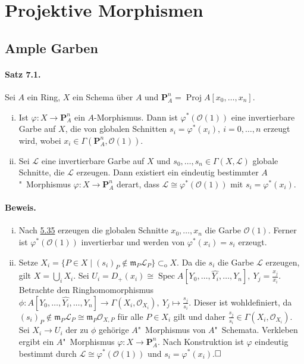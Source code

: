 \documentclass[11pt,b5paper,openany]{memoir}
\def \qed {$\hfill\square$}
\begin{document}
\section{Projektive Morphismen}

\subsection{Ample Garben}

\paragraph{Satz 7.1.}\label{7.1} Sei $A$ ein Ring, $X$ ein Schema über $A$ und $\mathbf{P}_A^n=\operatorname{Proj}A[x_0,\ldots,x_n]$.
\begin{enumerate}[(i)]
\item Ist $\varphi:X\to\mathbf{P}_A^n$ ein $A$-Morphismus. Dann ist $\varphi^\ast(\mathcal{O}(1))$ eine invertierbare Garbe auf $X$, die von globalen Schnitten $s_i=\varphi^\ast(x_i),\ i=0,\ldots,n$ erzeugt wird, wobei $x_i\in\Gamma(\mathbf{P}_A^n,\mathcal{O}(1))$.
\item Sei $\mathcal{L}$ eine invertierbare Garbe auf $X$ und $s_0,\ldots,s_n\in\Gamma(X,\mathcal{L})$ globale Schnitte, die $\mathcal{L}$ erzeugen. Dann existiert ein eindeutig bestimmter $A$"~Morphismus $\varphi:X\to\mathbf{P}_A^n$ derart, dass $\mathcal{L}\cong\varphi^\ast(\mathcal{O}(1))$ mit $s_i=\varphi^\ast(x_i)$.
\end{enumerate}

\paragraph{Beweis.} \begin{enumerate}[(i)]
\item Nach \hyperref[5.35]{5.35} erzeugen die globalen Schnitte $x_0,\ldots,x_n$ die Garbe $\mathcal{O}(1)$. Ferner ist $\varphi^\ast(\mathcal{O}(1))$ invertierbar und werden von $\varphi^\ast(x_i)=s_i$ erzeugt.
\item Setze $X_i=\{P\in X\mid (s_i)_P\not\in\mathfrak{m}_P\mathcal{L}_P\}\subset_\text{o}X$. Da die $s_i$ die Garbe $\mathcal{L}$ erzeugen, gilt $X=\bigcup_iX_i$. Sei $U_i=D_+(x_i)\cong\operatorname{Spec}A[Y_0,\ldots,\widehat{Y_i},\ldots,Y_n],\ Y_j=\frac{x_j}{x_i}$. Betrachte den Ringhomomorphismus $\phi:A[Y_0,\ldots,\widehat{Y_i},\ldots,Y_n]\to\Gamma(X_i,\mathcal{O}_{X_i}),\ Y_j\mapsto \frac{s_j}{s_i}$. Dieser ist wohldefiniert, da  $(s_i)_P\not\in \mathfrak{m}_P\mathcal{L}_P\cong\mathfrak{m}_P\mathcal{O}_{X,P}$ für alle $P\in X_i$ gilt und daher $\frac{s_j}{s_i}\in\Gamma(X_i,\mathcal{O}_{X_i})$. Sei $X_i\to U_i$ der zu $\phi$ gehörige $A$"~Morphismus von $A$"~Schemata. Verkleben ergibt ein $A$"~Morphismus $\varphi:X\to\mathbf{P}_A^n$. Nach Konstruktion ist $\varphi$ eindeutig bestimmt durch $\mathcal{L}\cong\varphi^\ast(\mathcal{O}(1))$ und $s_i=\varphi^\ast(x_i)$.\qed 
\end{enumerate}
\end{document}
